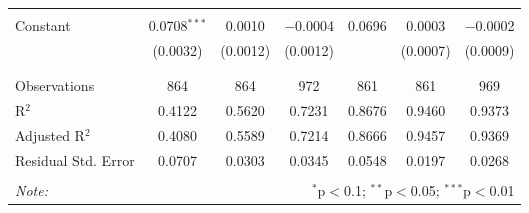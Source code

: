 \begin{table}[!htbp]
\begin{tabular}{@{\extracolsep{5pt}}lcccccc}
  & & & & & & \\ 
 Constant & 0.0708$^{***}$ & 0.0010 & $-$0.0004 & 0.0696 & 0.0003 & $-$0.0002 \\ 
  & (0.0032) & (0.0012) & (0.0012) &  & (0.0007) & (0.0009) \\ 
  & & & & & & \\ 
\hline \\[-1.8ex] 
Observations & 864 & 864 & 972 & 861 & 861 & 969 \\ 
R$^{2}$ & 0.4122 & 0.5620 & 0.7231 & 0.8676 & 0.9460 & 0.9373 \\ 
Adjusted R$^{2}$ & 0.4080 & 0.5589 & 0.7214 & 0.8666 & 0.9457 & 0.9369 \\ 
Residual Std. Error & 0.0707 & 0.0303 & 0.0345 & 0.0548 & 0.0197 & 0.0268 \\ 
\hline 
\hline \\[-1.8ex] 
\textit{Note:}  & \multicolumn{6}{r}{$^{*}$p$<$0.1; $^{**}$p$<$0.05; $^{***}$p$<$0.01} \\ 
\end{tabular} 
\end{table} 
